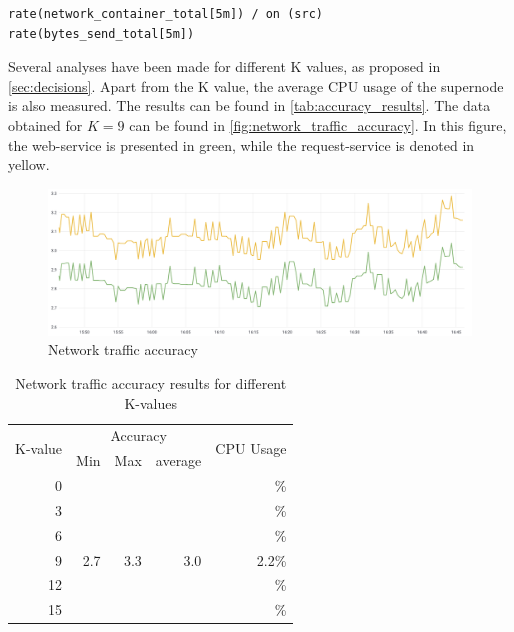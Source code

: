 \begin{verbatim}
rate(network_container_total[5m]) / on (src) 
rate(bytes_send_total[5m])
\end{verbatim}

\noindent
Several analyses have been made for different K values, as proposed in \autoref{sec:decisions}. Apart from the K value, the average CPU usage of the supernode is also measured. The results can be found in \autoref{tab:accuracy_results}. The data obtained for $K = 9$ can be found in \autoref{fig:network_traffic_accuracy}. In this figure, the web-service is presented in green, while the request-service is denoted in yellow.

\begin{figure}
    \centering
    \includegraphics[width=\textwidth]{gfx/traffic_network_accuracy}
    \caption{Network traffic accuracy}
    \label{fig:network_traffic_accuracy}
\end{figure}

\begin{table}[ht]
    \centering
    \begin{tabular}{r|rrr|r}
        \multirow{2}{*}{K-value} & \multicolumn{3}{|c|}{Accuracy} & \multirow{2}{*}{CPU Usage} \\
        & Min & Max & average & \\ \hline        
        0 &     &     &     & \% \\
        3 &     &     &     & \% \\
        6 &     &     &     & \% \\
        9 & 2.7 & 3.3 & 3.0 &2.2\% \\
        12&     &     &     & \% \\
        15&     &     &     & \% \\        
    \end{tabular}
    \caption{Network traffic accuracy results for different K-values}
    \label{tab:accuracy_results}
\end{table}

